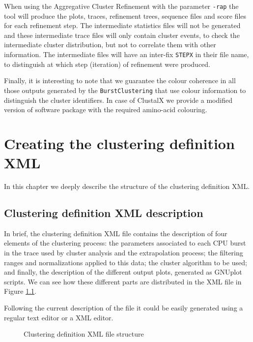 \documentclass[twoside,a4,english,11pt]{book}
\begin{document}
When using the Aggregative Cluster Refinement with the parameter \texttt{-rap}
the tool will produce the plots, traces, refinement trees, sequence files
and score files for each refinement step. The intermediate statistics files
will not be generated and these intermediate trace files will only contain
cluster events, to check the intermediate cluster distribution, but not to
correlate them with other information. The intermediate files will have an
inter-fix \texttt{STEPX} in their file name, to distinguish at which step
(iteration) of refinement were produced.

Finally, it is interesting to note that we guarantee the colour coherence
in all those outputs generated by the \texttt{BurstClustering} that use colour 
information to distinguish the cluster identifiers. In case of ClustalX we 
provide a modified version of software package with the required amino-acid
colouring.


\chapter{Creating the clustering definition XML}
\label{chap:xml_definition}

In this chapter we deeply describe the structure of the clustering definition
XML.

\section{Clustering definition XML description}

In brief, the clustering definition XML file contains the description of four
elements of the clustering process: the parameters associated to each CPU burst
in the trace used by cluster analysis and the extrapolation process; the
filtering ranges and normalizations applied to this data; the cluster 
algorithm to be used; and finally, the description of the different output
plots, generated as GNUplot scripts. We can see how these different parts are
distributed in the XML file in Figure \ref{fig:xml_structure}.

Following the current description of the file it could be easily generated
using a regular text editor or a XML editor.



\begin{figure}
  \centering
  
  
  \caption{Clustering definition XML file structure}
  \label{fig:xml_structure}
  
\end{figure}
\end{document}
